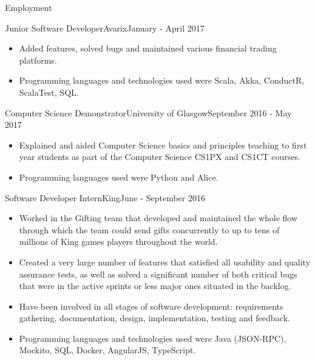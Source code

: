 \documentclass[]{cv}
\begin{document}
\begin{cvsection}{Employment}
		\begin{cvsubsection}{Junior Software Developer}{Avarix}{January - April 2017}
			\begin{itemize}
				\item Added features, solved bugs and maintained various financial trading platforms.
				\item Programming languages and technologies used were Scala, Akka, ConductR, ScalaTest, SQL.
			\end{itemize}
		\end{cvsubsection}

		\begin{cvsubsection}{Computer Science Demonstrator}{University of Glasgow}{September 2016 - May 2017}
			\begin{itemize}
				\item Explained and aided Computer Science basics and principles teaching to first year students as part of the Computer Science CS1PX and CS1CT courses.
				\item Programming languages used were Python and Alice.
			\end{itemize}
		\end{cvsubsection}

		\begin{cvsubsection}{Software Developer Intern}{King}{June - September 2016}
			\begin{itemize}
				\item Worked in the Gifting team that developed and maintained the whole flow through which the team could send gifts concurrently to up to tens of 
					millions of King games players throughout the world.
				\item Created a very large number of features that satisfied all usability and quality assurance tests, as well as solved a significant number of 
					both critical bugs that were in the active sprints or less major ones situated in the backlog.
				\item Have been involved in all stages of software development: requirements gathering, documentation, design, implementation, testing and feedback.
				\item Programming languages and technologies used were Java (JSON-RPC), Mockito, SQL, Docker, AngularJS, TypeScript.
			\end{itemize}
		\end{cvsubsection}


\end{cvsection}
\end{document}
